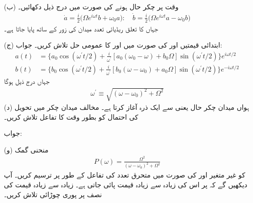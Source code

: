 (ب) وقت  پر  چکر حال ہونے کی صورت میں درج ذیل دکھائیں۔
\begin{align}
	\dot{a} = \frac{i}{2}\big(\Omega e^{i\omega t}b+\omega_0 a\big):\quad\dot{b} = \frac{i}{2}\big(\Omega e^{i\omega t}a-\omega_0 b\big)
\end{align}
جہاں  کا تعلق ریڈیائی تعدد میدان کی زور کے ساتھ پایا جاتا ہے۔

(ج) ابتدائی قیمتیں  اور  کی صورت میں  اور  کا عمومی حل تلاش کریں۔ جواب: 
\begin{align*}
	a(t) &= \bigg\{a_0\cos(\omega^\prime t/2)+\frac{i}{\omega^\prime}[a_0(\omega_0-\omega)+b_0\Omega]\sin(\omega^\prime t/2)\bigg\}e^{i\omega t/2} \\
	b(t) &= \bigg\{b_0\cos(\omega^\prime t/2)+\frac{i}{\omega^\prime}[b_0(\omega-\omega_0)+a_0\Omega]\sin(\omega^\prime t/2)\bigg\}e^{-i\omega t/2}
\end{align*}
جہاں درج ذیل ہوگا
\begin{align}
	\omega^\prime\equiv\sqrt{(\omega-\omega_0)^2+\Omega^2}
\end{align}
(د) ہواں میدان چکر حال یعنی  سے ایک ذرہ آغاز کرتا ہے۔ مخالف میدان چکر میں تحویل کی احتمال کو بطور وقت کا تفاعل تلاش کریں۔

جواب: 

(و) منحنی گمک
\begin{align}
	P(\omega) = \frac{\Omega^2}{(\omega-\omega_0)^2+\Omega^2}
\end{align}
کو غیر متغیر  اور  کی صورت میں متحرق تعدد  کی تفاعل کے طور پر ترسیم کریں۔ آپ دیکھیں گے کہ  پر اس کی زیادہ سے زیادہ قیمت پائی جاتی ہے۔ زیادہ سے زیادہ قیمت کی نصف پر پوری چوڑائی  تلاش کریں۔

